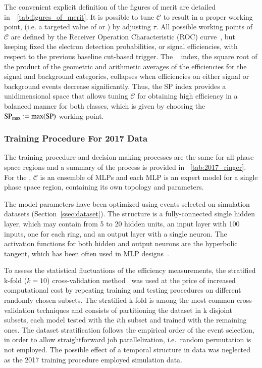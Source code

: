 The convenient explicit definition of the figures of merit are detailed in~\tablename~\ref{tab:figures_of_merit}.
It is possible to tune $\mathcal{C}$ to result in a proper working point, (i.e. a targeted value of \pd{} or \pf{}) by adjusting $\tau$. All possible working points of $\mathcal{C}$ are defined by the Receiver Operation Characteristic (ROC) curve~\cite{van_trees_part1}, but keeping fixed the electron detection probabilities, or signal efficiencies, with respect to the previous baseline cut-based trigger. The \spindex{}~\cite{dos2006neural} index, the square root of the product of the geometric and arithmetic averages of the efficiencies for the signal and background categories, collapses when efficiencies on either signal or background events decrease significantly. Thus, the SP index provides a unidimensional space that allows tuning $\mathcal{C}$ for obtaining high efficiency in a balanced manner for both classes, which is given by choosing the $\text{SP}_{\text{max}}{}:=\max(\text{SP}{})$ working point.











\subsubsection{Training Procedure For 2017 Data}\label{ssec:2017}

The training procedure and decision making processes are the same for all phase
space regions and a summary of the process is provided in
\tablename~\ref{tab:2017_ringer}. For the \rnn{}, $\mathcal{C}$ is an ensemble of
MLPs and each MLP is an expert model for a single phase space
region, containing its own topology and parameters.

The model parameters have been optimized using events selected on simulation datasets
(Section~\ref{ssec:dataset}). The structure is a fully-connected single
hidden layer, which may contain from 5 to 20 hidden units, an input layer with 100 inputs, one for each ring, and an output layer with a single neuron. The activation
functions for both hidden and output neurons are the hyperbolic tangent, which has been often used in MLP designs~\cite{haykin_2008}. 

To assess the statistical fluctuations of the efficiency measurements, the stratified k-fold ($k=10$) cross-validation method~\cite{haykin_2008} was used at the price of increased computational cost by repeating training and testing procedures on different
randomly chosen subsets. The stratified k-fold is
among the most common cross-validation techniques and consists of partitioning
the dataset in k disjoint subsets, each model tested with the $i$th subset and
trained with the remaining ones. The dataset stratification follows the
empirical order of the event selection, in order to allow straightforward job
parallelization, i.e.\ random permutation is not employed. The possible effect
of a temporal structure in data was neglected as the 2017 training procedure
employed simulation data.

